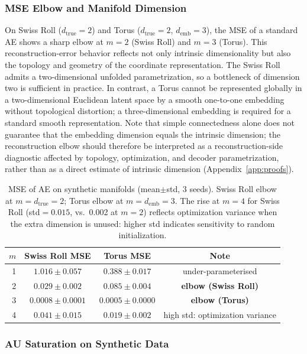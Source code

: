 \documentclass[make,article,submit,pdftex,moreauthors]{Definitions/mdpi}
\begin{document}
\subsubsection{MSE Elbow and Manifold Dimension}

On Swiss Roll ($d_{\mathrm{true}}=2$) and Torus ($d_{\mathrm{true}}=2$,
$d_{\mathrm{emb}}=3$), the MSE of a standard AE shows a sharp elbow at $m=2$
(Swiss Roll) and $m=3$ (Torus).
This reconstruction-error behavior reflects not only intrinsic dimensionality
but also the topology and geometry of the coordinate representation.
The Swiss Roll admits a two-dimensional unfolded parametrization, so a
bottleneck of dimension two is sufficient in practice.
In contrast, a Torus cannot be represented globally in a two-dimensional
Euclidean latent space by a smooth one-to-one embedding without topological
distortion; a three-dimensional embedding is required for a standard smooth
representation.
Note that simple connectedness alone does not guarantee that the embedding
dimension equals the intrinsic dimension; the reconstruction elbow should
therefore be interpreted as a reconstruction-side diagnostic affected by
topology, optimization, and decoder parametrization, rather than as a direct
estimate of intrinsic dimension (Appendix~\ref{app:proofs}).

\begin{table}[ht]
\centering
\caption{MSE of AE on synthetic manifolds (mean$\pm$std, 3 seeds).
Swiss Roll elbow at $m=d_{\mathrm{true}}=2$; Torus elbow at $m=d_{\mathrm{emb}}=3$.
The rise at $m=4$ for Swiss Roll (std$=0.015$, vs.\ 0.002 at $m=2$) reflects
optimization variance when the extra dimension is unused: higher std indicates
sensitivity to random initialization.}
\label{tab:e1}
\small
\begin{tabular}{rccc}
\toprule
$m$ & Swiss Roll MSE & Torus MSE & Note \\
\midrule
1 & $1.016\pm0.057$ & $0.388\pm0.017$ & under-parameterised \\
2 & $\boldsymbol{0.029\pm0.002}$ & $0.085\pm0.004$ & \textbf{elbow (Swiss Roll)} \\
3 & $0.0008\pm0.0001$ & $\boldsymbol{0.0005\pm0.0000}$ & \textbf{elbow (Torus)} \\
4 & $0.041\pm0.015$ & $0.019\pm0.002$ & high std: optimization variance \\
\bottomrule
\end{tabular}
\end{table}

\subsubsection{AU Saturation on Synthetic Data}
\end{document}
